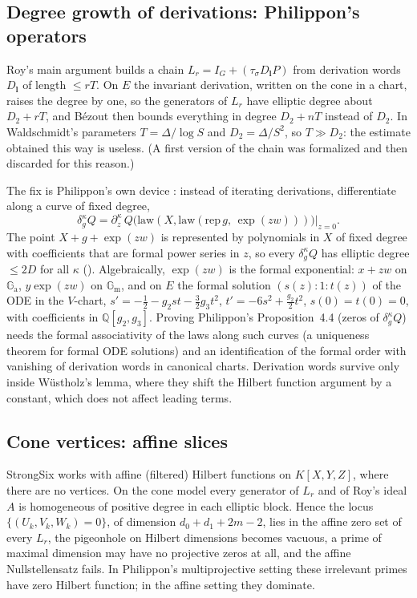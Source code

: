 \documentclass[11pt]{amsart}
\theoremstyle{definition}
\theoremstyle{remark}
\numberwithin{equation}{section}
\newcommand{\QQ}{\mathbb{Q}}
\newcommand{\Ga}{\mathbb{G}_{\mathrm{a}}}
\newcommand{\Gm}{\mathbb{G}_{\mathrm{m}}}
\begin{document}
\subsection{Degree growth of derivations: Philippon's operators}
Roy's main argument builds a chain $L_r=I_G+(\tau_\sigma D_{\mathbf l}P)$ from derivation words $D_{\mathbf
l}$ of length $\le rT$. On $E$ the invariant derivation, written on the cone in a chart, raises the
degree by one, so the generators of $L_r$ have elliptic degree about $D_2+rT$, and Bézout then bounds
everything in degree $D_2+nT$ instead of $D_2$. In Waldschmidt's parameters $T=\Delta/\log S$ and
$D_2=\Delta/S^2$, so $T\gg D_2$: the estimate obtained this way is useless. (A first version of the chain
was formalized and then discarded for this reason.)

The fix is Philippon's own device \cite[\S4.1, Déf.~4.1--4.2, Prop.~4.3--4.4]{Philippon1986}: instead of
iterating derivations, differentiate along a curve of fixed degree,
\[
\delta^\kappa_gQ=\partial_z^\kappa\,Q\bigl(\mathrm{law}(X,\mathrm{law}(\mathrm{rep}\,g,\,\exp(zw)))\bigr)\big|_{z=0}.
\]
The point $X+g+\exp(zw)$ is represented by polynomials in $X$ of fixed degree with coefficients that are
formal power series in $z$, so every $\delta^\kappa_gQ$ has elliptic degree $\le2D$ for all $\kappa$
(). Algebraically, $\exp(zw)$ is the formal exponential: $x+zw$ on $\Ga$, $y\exp(zw)$
on $\Gm$, and on $E$ the formal solution $(s(z):1:t(z))$ of the ODE in the $V$-chart,
$s'=-\frac12-g_2st-\frac32g_3t^2$, $t'=-6s^2+\frac{g_2}2t^2$, $s(0)=t(0)=0$, with coefficients in
$\QQ[g_2,g_3]$. Proving Philippon's Proposition~4.4 (zeros of $\delta^\kappa_gQ$) needs the formal
associativity of the laws along such curves (a uniqueness theorem for formal ODE solutions) and an
identification of the formal order with vanishing of derivation words in canonical charts. Derivation
words survive only inside Wüstholz's lemma, where they shift the Hilbert function argument by a
constant, which does not affect leading terms.

\subsection{Cone vertices: affine slices}\label{sec:slices}
StrongSix works with affine (filtered) Hilbert functions on $K[X,Y,Z]$, where there are no vertices.
On the cone model every generator of $L_r$ and of Roy's ideal $A$ is homogeneous of positive degree in
each elliptic block. Hence the locus $\{(U_k,V_k,W_k)=0\}$, of dimension $d_0+d_1+2m-2$, lies in the
affine zero set of every $L_r$, the pigeonhole on Hilbert dimensions becomes vacuous, a prime of
maximal dimension may have no projective zeros at all, and the affine Nullstellensatz fails. In
Philippon's multiprojective setting these irrelevant primes have zero Hilbert function; in the affine
setting they dominate.
\end{document}
